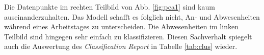 Die Datenpunkte im rechten Teilbild von Abb. \ref{fig:pca1} sind kaum auseinanderzuhalten. Das Modell schafft es
folglich nicht, An- und Abwesenheiten während eines Arbeitstages zu unterscheiden. Die Abwesenheiten im linken
Teilbild sind hingegen sehr einfach zu klassifizieren.
Diesen Sachverhalt spiegelt auch die Auswertung des \textit{Classification Report} in Tabelle \ref{tab:clus} 
wieder.\\

